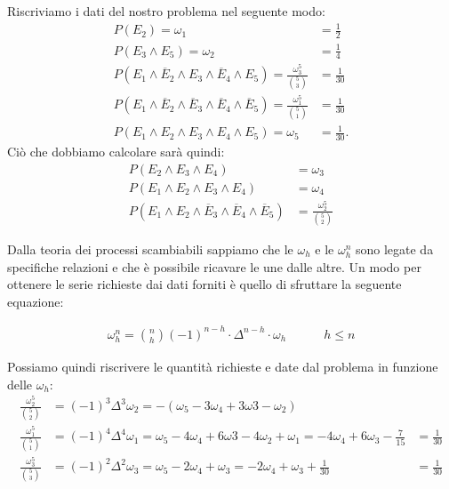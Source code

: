 Riscriviamo i dati del nostro problema nel seguente modo:
\begin{align*}
	P(E_{2})=\omega_{1}&=\frac{1}{2}\\
	 P(E_{3}\wedge E_{5}) =\omega_{2} &=\frac{1}{4}\\
	 P(E_{1}\wedge\overline{E}_{2}\wedge E_{3}\wedge\overline{E}_{4}\wedge E_{5}) =\frac{\omega_{3}^5}{\binom{5}{3}}&=\frac{1}{30} \\
	 P(E_{1}\wedge\overline{E}_{2}\wedge\overline{E}_{3}\wedge\overline{E}_{4}\wedge\overline{E}_{5}) =\frac{\omega_{1}^5}{\binom{5}{1}}&=\frac{1}{30} \\
	 P(E_{1}\wedge E_{2}\wedge E_{3}\wedge E_{4}\wedge E_{5}) =\omega_{5}&=\frac{1}{30}.
\end{align*}
Ciò che dobbiamo calcolare sarà quindi:
\begin{align*}
 P(E_{2}\wedge E_{3}\wedge E_{4})&=\omega_{3}\\
 P(E_{1}\wedge E_{2}\wedge E_{3}\wedge E_{4})&=\omega_{4}\\
 P(E_{1}\wedge E_{2}\wedge\overline{E}_{3}\wedge\overline{E}_{4}\wedge\overline{E}_{5})&=\frac{\omega_{2}^5}{\binom{5}{2}}
\end{align*}

Dalla teoria dei processi scambiabili sappiamo che le $\omega_h$ e le $\omega^n_h$ sono
legate da specifiche relazioni e che è possibile ricavare le une dalle altre. 
Un modo per ottenere le serie richieste dai dati forniti è quello di sfruttare la 
seguente equazione:

\begin{align*}
    \omega_h^n = \binom{n}{h}(-1)^{n-h}\cdot\Delta^{n-h}\cdot\omega_h \quad \quad \quad  h\leq n
\end{align*}

Possiamo quindi riscrivere le quantità richieste e date dal problema  in funzione 
delle $\omega_h$:
\begin{align*}
    \frac{\omega_2^5}{\binom{5}{2}} &= (-1)^3\Delta^3\omega_2=-(\omega_5-3\omega_4+3\omega3-\omega_2)\\
    \frac{\omega_1^5}{\binom{5}{1}} &= (-1)^4\Delta^4\omega_1=\omega_5-4\omega_4+6\omega3-4\omega_2+\omega_1 =  -4\omega_4+6\omega_3-\frac{7}{15} &= \frac{1}{30} \\
    \frac{\omega_3^5}{\binom{5}{3}} &= (-1)^2\Delta^2\omega_3=\omega_5-2\omega_4+\omega_3=-2\omega_4+\omega_3+\frac{1}{30} &= \frac{1}{30} 
\end{align*}

